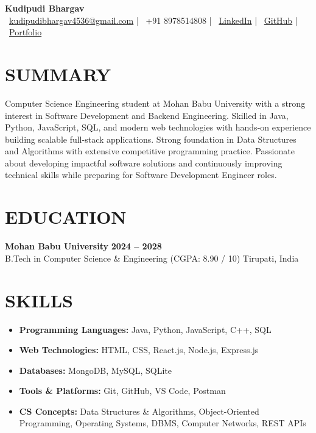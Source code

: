 \documentclass[10pt,letterpaper]{article}
\begin{document}
\begin{center}
    {\Huge \textbf{Kudipudi Bhargav}} \\
    \vspace{8pt}
    \small
    \faEnvelope\ \href{mailto:kudipudibhargav4536@gmail.com}{kudipudibhargav4536@gmail.com} \quad | \quad 
    \faPhone\ +91 8978514808 \quad | \quad 
    \faLinkedin\ \href{https://www.linkedin.com/in/kudipudi-bhargav/}{LinkedIn} \quad | \quad 
    \faGithub\ \href{https://github.com/kudipudibhargav}{GitHub} \quad | \quad 
    \faGlobe\ \href{https://kudipudibhargav.github.io/}{Portfolio}
\end{center}

\vspace{6pt}

\section*{SUMMARY}
\noindent Computer Science Engineering student at Mohan Babu University with a strong interest in Software Development and Backend Engineering. Skilled in Java, Python, JavaScript, SQL, and modern web technologies with hands-on experience building scalable full-stack applications. Strong foundation in Data Structures and Algorithms with extensive competitive programming practice. Passionate about developing impactful software solutions and continuously improving technical skills while preparing for Software Development Engineer roles.

\section*{EDUCATION}
\noindent \textbf{Mohan Babu University} \hfill \textbf{2024 -- 2028} \\
B.Tech in Computer Science \& Engineering (CGPA: 8.90 / 10) \hfill Tirupati, India

\section*{SKILLS}
\begin{itemize}[leftmargin=*, itemsep=4pt, topsep=2pt, parsep=0pt, label=\textbullet]
    \item \textbf{Programming Languages:} Java, Python, JavaScript, C++, SQL
    \item \textbf{Web Technologies:} HTML, CSS, React.js, Node.js, Express.js
    \item \textbf{Databases:} MongoDB, MySQL, SQLite
    \item \textbf{Tools \& Platforms:} Git, GitHub, VS Code, Postman
    \item \textbf{CS Concepts:} Data Structures \& Algorithms, Object-Oriented Programming, Operating Systems, DBMS, Computer Networks, REST APIs
\end{itemize}
\end{document}
